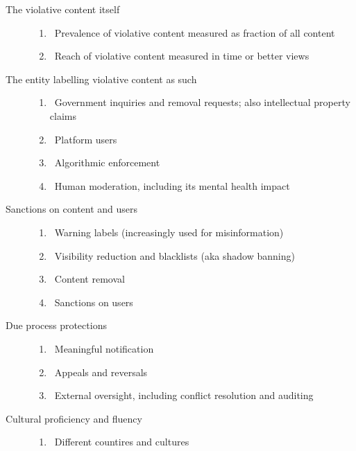 
\begin{description}
\item[The violative content itself]\hfill
    \begin{enumerate}
        \item {}~Prevalence of violative content measured as fraction
            of all content
        \item {}~Reach of violative content measured in time
            or better views
    \end{enumerate}
\item[The entity labelling violative content as such]\hfill
    \begin{enumerate}[resume]
        \item {}~Government inquiries and removal
            requests; also intellectual property claims
        \item {}~Platform users
        \item {}~Algorithmic enforcement
        \item {}~Human moderation, including its mental health impact
    \end{enumerate}
\item[Sanctions on content and users]\hfill
    \begin{enumerate}[resume]
        \item {}~Warning labels (increasingly used for misinformation)
        \item {}~Visibility reduction and blacklists (aka shadow
            banning)
        \item {}~Content removal
        \item {}~Sanctions on users
    \end{enumerate}
\item[Due process protections]\hfill
    \begin{enumerate}[resume]
        \item {}~Meaningful notification
        \item {}~Appeals and reversals
        \item {}~External oversight, including conflict resolution and auditing
    \end{enumerate}
\item[Cultural proficiency and fluency]\hfill
    \begin{enumerate}[resume]
        \item {}~Different countires and cultures
    \end{enumerate}
\end{description}

